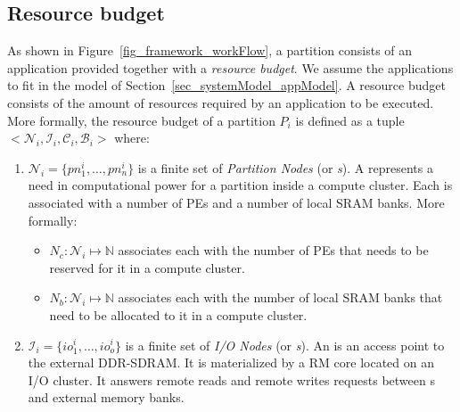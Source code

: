 \documentclass[main.tex]{subfiles}
\begin{document}
\subsection{Resource budget}
\label{ssec_framework_partitionModel}
As shown in Figure~\ref{fig_framework_workFlow}, a partition consists of an
application provided together with a \emph{resource budget}. We assume the
applications to fit in the model of Section~\ref{sec_systemModel_appModel}. A
resource budget consists of the amount of resources required by an application
to be executed. More formally, the resource budget of a partition $P_i$ is
defined as a tuple $<\mathcal{N}_i, \mathcal{I}_i, \mathcal{C}_i,
\mathcal{B}_i>$ where:
\begin{enumerate}
    \item $\mathcal{N}_i = \{ pn_1^i , \ldots , pn_n^i \}$ is a finite set
        of \emph{Partition Nodes} (or \emph{\PN{}s}). A \PN{} represents a
        need in computational power for a partition inside a compute
        cluster. Each \PN{} is associated with a number of PEs and a number
        of local SRAM banks. More formally: 
        \begin{itemize}
            \item $N_c : \mathcal{N}_i \mapsto \mathbb{N}$ associates each
                \PN{} with the number of PEs that needs to be reserved for
                it in a compute cluster.
            \item $N_b : \mathcal{N}_i \mapsto \mathbb{N}$ associates each
                \PN{} with the number of local SRAM banks that need to be
                allocated to it in a compute cluster.
        \end{itemize}

    \item  $\mathcal{I}_i = \{ io_1^i , \ldots , io_o^i \}$ is a finite set
        of \emph{I/O Nodes} (or \emph{\ION{}s}). An \ION{} is an access
        point to the external DDR-SDRAM. It is materialized by a RM core
        located on an I/O cluster. It answers remote reads and remote
        writes requests between \PN{}s and external memory banks.


\end{enumerate}
\end{document}
